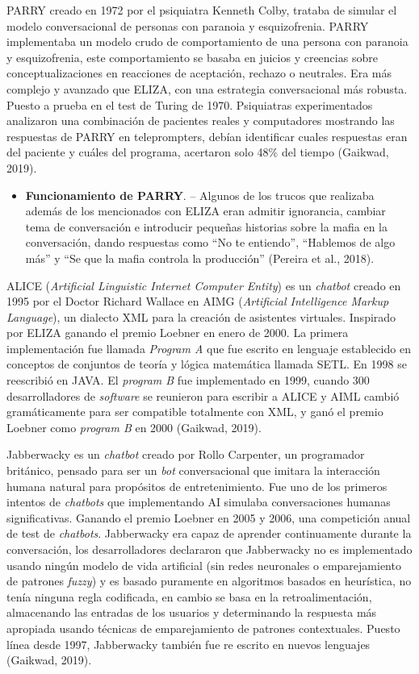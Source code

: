 \documentclass[letter, openright, 12pt]{book}
\begin{document}
PARRY creado en 1972 por el psiquiatra Kenneth Colby, trataba de simular el modelo conversacional de personas con paranoia y esquizofrenia. PARRY implementaba un modelo crudo de comportamiento de una persona con paranoia y esquizofrenia, este comportamiento se basaba en juicios y creencias sobre conceptualizaciones en reacciones de aceptación, rechazo o neutrales. Era más complejo y avanzado que ELIZA, con una estrategia conversacional más robusta. Puesto a prueba en el test de Turing de 1970. Psiquiatras experimentados analizaron una combinación de pacientes reales y computadores mostrando las respuestas de PARRY en teleprompters, debían identificar cuales respuestas eran del paciente y cuáles del programa, acertaron solo 48\% del tiempo (Gaikwad, 2019).

\begin{itemize}
\item \textbf{Funcionamiento de PARRY}. – Algunos de los trucos que realizaba además de los mencionados con ELIZA eran admitir ignorancia, cambiar tema de conversación e introducir pequeñas historias sobre la mafia en la conversación, dando respuestas como “No te entiendo”, “Hablemos de algo más” y “Se que la mafia controla la producción” (Pereira et al., 2018).
\end{itemize}


ALICE (\textit{Artificial Linguistic Internet Computer Entity}) es un \textit{chatbot} creado en 1995 por el Doctor Richard Wallace en AIMG (\textit{Artificial Intelligence Markup Language}), un dialecto XML para la creación de asistentes virtuales. Inspirado por ELIZA ganando el premio Loebner en enero de 2000. La primera implementación fue llamada \textit{Program A} que fue escrito en lenguaje establecido en conceptos de conjuntos de teoría y lógica matemática llamada SETL. En 1998 se reescribió en JAVA. El \textit{program B} fue implementado en 1999, cuando 300 desarrolladores de \textit{software} se reunieron para escribir a ALICE y AIML cambió gramáticamente para ser compatible totalmente con XML, y ganó el premio Loebner como \textit{program B} en 2000 (Gaikwad, 2019).

Jabberwacky es un \textit{chatbot} creado por Rollo Carpenter, un programador británico, pensado para ser un \textit{bot} conversacional que imitara la interacción humana natural para propósitos de entretenimiento. Fue uno de los primeros intentos de \textit{chatbots} que implementando AI simulaba conversaciones humanas significativas. Ganando el premio Loebner en 2005 y 2006, una competición anual de test de \textit{chatbots}. Jabberwacky era capaz de aprender continuamente durante la conversación, los desarrolladores declararon que Jabberwacky no es implementado usando ningún modelo de vida artificial (sin redes neuronales o emparejamiento de patrones \textit{fuzzy}) y es basado puramente en algoritmos basados en heurística, no tenía ninguna regla codificada, en cambio se basa en la retroalimentación, almacenando las entradas de los usuarios y determinando la respuesta más apropiada usando técnicas de emparejamiento de patrones contextuales. Puesto línea desde 1997, Jabberwacky también fue re escrito en nuevos lenguajes (Gaikwad, 2019).
\end{document}
